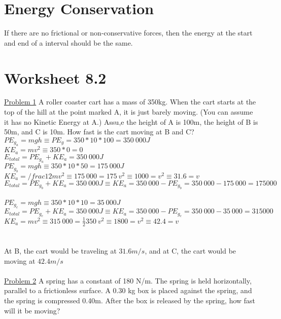 \documentclass[]{article}
\date{}
\title{\docTitle}
\author{\docAuthor}
\date{\today}
\begin{document}
\maketitle
\section*{Energy Conservation}

If there are no frictional or non-conservative forces, then the energy at the start and end of a interval should be the same.\\

\section*{Worksheet 8.2}
\underline{Problem 1} A roller coaster cart has a mass of 350kg. When the cart starts at the top of the hill at the point marked A, it is just barely moving. (You can assume it has no Kinetic Energy at A.) Assu,e the height of A is 100m, the height of B is 50m, and C is 10m. How fast is the cart moving at B and C?\\
$PE_{g_a} = mgh \equiv PE_g = 350 * 10 * 100 = 350\ 000J$\\
$KE_a = mv^2 \equiv 350 * 0 = 0$\\
$E_{total} = PE_{g_a} + KE_a = 350\ 000J$
\\
$PE_{g_b} = mgh \equiv 350 * 10 * 50 = 175\ 000J$\\
$KE_a = /frac{1}{2}mv^2 \equiv 175\ 000 = 175\ v^2 \equiv 1000 = v^2 \equiv 31.6 = v$\\
$E_{total} = PE_{g_b} + KE_a = 350\ 000J \equiv KE_a = 350\ 000 - PE_{g_b} = 350\ 000 - 175\ 000 = 175000$\\
\\
$PE_{g_c} = mgh \equiv 350 * 10 * 10 = 35\ 000J$\\
$E_{total} = PE_{g_c} + KE_a = 350\ 000J \equiv KE_a = 350\ 000 - PE_{g_c} = 350\ 000 - 35\ 000 = 315000$\\
$KE_a = mv^2 \equiv 315\ 000 = \frac{1}{2}350\ v^2 \equiv 1800 = v^2 \equiv 42.4 = v$\\
\\
\\
At B, the cart would be traveling at \(31.6 m/s\), and at C, the cart would be moving at $42.4 m/s$\\
\\
\underline{Problem 2} A spring has a constant of 180 N/m. The spring is held horizontally, parallel to a frictionless surface. A 0.30 kg box is placed against the spring, and the spring is compressed 0.40m. After the box is released by the spring, how fast will it be moving?
\end{document}

